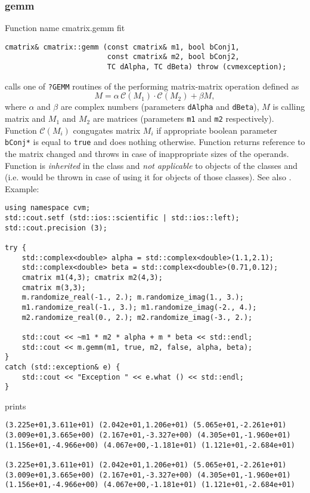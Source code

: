 \subsubsection{gemm}
Function%
\pdfdest name {cmatrix.gemm} fit
\begin{verbatim}
cmatrix& cmatrix::gemm (const cmatrix& m1, bool bConj1, 
                        const cmatrix& m2, bool bConj2, 
                        TC dAlpha, TC dBeta) throw (cvmexception);
\end{verbatim}
calls one of \verb"?GEMM" routines of the
performing  
matrix-matrix operation defined as
\begin{equation*}
M=\alpha\,\mathcal{C}(M_1)\cdot\mathcal{C}(M_2) + \beta M,
\end{equation*}
where $\alpha$ and $\beta$ are complex numbers
(parameters \verb"dAlpha" and \verb"dBeta"),
$M$ is  calling matrix
and $M_1$ and $M_2$ are matrices (parameters \verb"m1"
and \verb"m2" respectively). Function $\mathcal{C}(M_i)$
congugates matrix $M_i$ if appropriate boolean
parameter \verb"bConj*" is equal to \verb"true"
and does nothing otherwise.
Function
returns  reference to the matrix changed and throws
in case of inappropriate sizes of the operands.
Function is \emph{inherited} in  the class
 and
\emph{not applicable} to objects of the classes
 and
 (i.e.  would be thrown
in case of using it for objects of those classes).
See also
.
Example:
\begin{Verbatim}
using namespace cvm;
std::cout.setf (std::ios::scientific | std::ios::left); 
std::cout.precision (3);

try {
    std::complex<double> alpha = std::complex<double>(1.1,2.1);
    std::complex<double> beta = std::complex<double>(0.71,0.12);
    cmatrix m1(4,3); cmatrix m2(4,3);
    cmatrix m(3,3);
    m.randomize_real(-1., 2.); m.randomize_imag(1., 3.); 
    m1.randomize_real(-1., 3.); m1.randomize_imag(-2., 4.); 
    m2.randomize_real(0., 2.); m2.randomize_imag(-3., 2.);

    std::cout << ~m1 * m2 * alpha + m * beta << std::endl;
    std::cout << m.gemm(m1, true, m2, false, alpha, beta);
}
catch (std::exception& e) {
    std::cout << "Exception " << e.what () << std::endl;
}
\end{Verbatim}
prints
\begin{Verbatim}
(3.225e+01,3.611e+01) (2.042e+01,1.206e+01) (5.065e+01,-2.261e+01)
(3.009e+01,3.665e+00) (2.167e+01,-3.327e+00) (4.305e+01,-1.960e+01)
(1.156e+01,-4.966e+00) (4.067e+00,-1.181e+01) (1.121e+01,-2.684e+01)

(3.225e+01,3.611e+01) (2.042e+01,1.206e+01) (5.065e+01,-2.261e+01)
(3.009e+01,3.665e+00) (2.167e+01,-3.327e+00) (4.305e+01,-1.960e+01)
(1.156e+01,-4.966e+00) (4.067e+00,-1.181e+01) (1.121e+01,-2.684e+01)
\end{Verbatim}
\newpage


